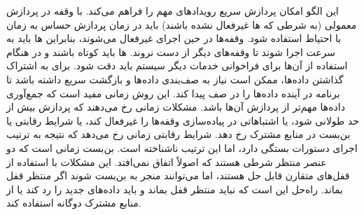 \begin{RTL}
این الگو امکان پردازش سریع رویدادهای مهم را فراهم می‌کند.
با وقفه در پردازش معمولی (به شرطی که ها غیرفعال نشده باشند)
باید در زمان پردازش حساس به زمان با احتیاط استفاده شود.
وقفه‌ها در حین اجرای 
غیرفعال می‌شوند، بنابراین ها باید به سرعت اجرا شوند تا وقفه‌های دیگر
از دست نروند.
ها باید کوتاه باشند و در هنگام استفاده
از آن‌ها برای فراخوانی خدمات دیگر سیستم باید دقت
شود. برای به اشتراک گذاشتن داده‌ها، 
ممکن است نیاز به صف‌بندی داده‌ها و بازگشت سریع داشته باشد تا برنامه در آینده
داده‌ها را در صف پیدا کند. این روش زمانی مفید است که جمع‌آوری
داده‌ها مهم‌تر از پردازش آن‌ها باشد. مشکلات زمانی رخ
می‌دهند که پردازش  بیش از حد طولانی شود،
یا اشتباهاتی در پیاده‌سازی وقفه‌ها را غیرفعال کند، یا شرایط رقابتی یا بن‌بست
در منابع مشترک رخ دهد.
شرایط رقابتی زمانی رخ می‌دهد که نتیجه به ترتیب اجرای دستورات
بستگی دارد، اما این ترتیب ناشناخته است. بن‌بست زمانی است
که دو عنصر منتظر شرطی هستند که اصولاً اتفاق نمی‌افتد.
این مشکلات با استفاده از قفل‌های متقارن قابل حل
هستند، اما می‌توانند منجر به بن‌بست
شوند اگر  منتظر قفل بماند. راه‌حل این است که
 نباید منتظر قفل بماند و باید داده‌های جدید را رد کند
یا از منابع مشترک دوگانه استفاده کند.
\end{RTL}